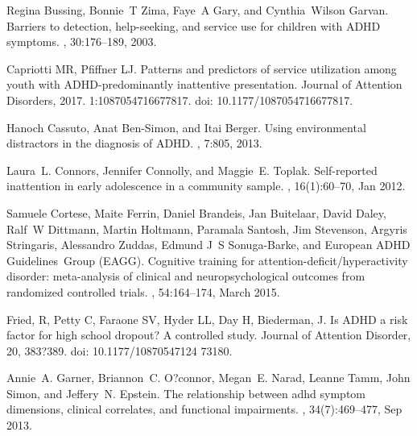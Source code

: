 \documentclass[10pt,letterpaper]{article}
\begin{document}
\begin{thebibliography}{10}
Regina Bussing, Bonnie~T Zima, Faye~A Gary, and Cynthia~Wilson Garvan.
\newblock Barriers to detection, help-seeking, and service use for children
  with {ADHD} symptoms.
,
  30:176--189, 2003.

Capriotti MR, Pfiffner LJ.
\newblock Patterns and predictors of service utilization among youth with
  {ADHD}-predominantly inattentive presentation.
\newblock Journal of Attention Disorders, 2017. 1:1087054716677817. doi: 10.1177/1087054716677817.

Hanoch Cassuto, Anat Ben-Simon, and Itai Berger.
\newblock Using environmental distractors in the diagnosis of {ADHD}.
, 7:805, 2013.

Laura~L. Connors, Jennifer Connolly, and Maggie~E. Toplak.
\newblock Self-reported inattention in early adolescence in a community sample.
, 16(1):60--70, Jan 2012.

Samuele Cortese, Maite Ferrin, Daniel Brandeis, Jan Buitelaar, David Daley,
  Ralf~W Dittmann, Martin Holtmann, Paramala Santosh, Jim Stevenson, Argyris
  Stringaris, Alessandro Zuddas, Edmund J~S Sonuga-Barke, and European ADHD
  Guidelines~Group (EAGG).
\newblock Cognitive training for attention-deficit/hyperactivity disorder:
  meta-analysis of clinical and neuropsychological outcomes from randomized
  controlled trials.
, 54:164--174, March 2015.
  
 Fried, R, Petty C, Faraone SV, Hyder LL, Day H, Biederman, J.
\newblock Is ADHD a risk factor for high school dropout? A controlled
study. 
 \newblock Journal of Attention Disorder, 20, 383?389. doi: 10.1177/10870547124
73180.
 
 
Annie~A. Garner, Briannon~C. O?connor, Megan~E. Narad, Leanne Tamm, John Simon,
  and Jeffery~N. Epstein.
\newblock The relationship between adhd symptom dimensions, clinical
  correlates, and functional impairments.
, 34(7):469--477, Sep 2013.



\end{thebibliography}
\end{document}
